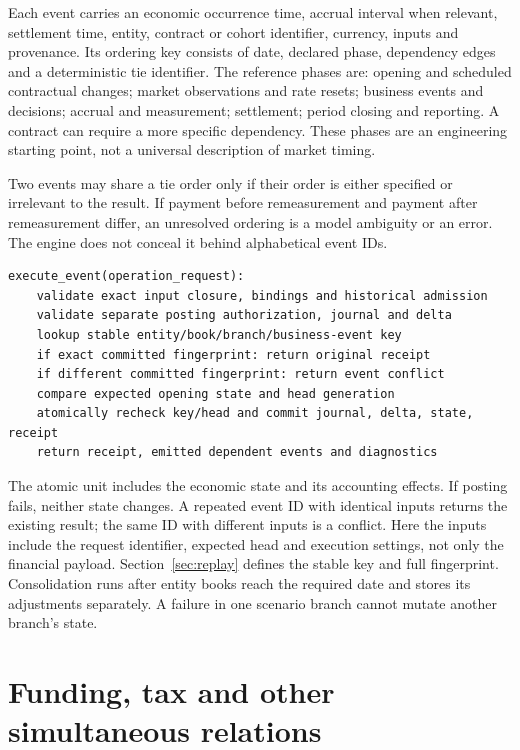 Each event carries an economic occurrence time, accrual interval when relevant,
settlement time, entity, contract or cohort identifier, currency, inputs and
provenance. Its ordering key consists of date, declared phase, dependency edges
and a deterministic tie identifier. The reference phases are: opening and
scheduled contractual changes; market observations and rate resets; business
events and decisions; accrual and measurement; settlement; period closing and
reporting. A contract can require a more specific dependency. These phases are
an engineering starting point, not a universal description of market timing.

Two events may share a tie order only if their order is either specified or
irrelevant to the result. If payment before remeasurement and payment after
remeasurement differ, an unresolved ordering is a model ambiguity or an error.
The engine does not conceal it behind alphabetical event IDs.

\begin{lstlisting}
execute_event(operation_request):
    validate exact input closure, bindings and historical admission
    validate separate posting authorization, journal and delta
    lookup stable entity/book/branch/business-event key
    if exact committed fingerprint: return original receipt
    if different committed fingerprint: return event conflict
    compare expected opening state and head generation
    atomically recheck key/head and commit journal, delta, state, receipt
    return receipt, emitted dependent events and diagnostics
\end{lstlisting}

The atomic unit includes the economic state and its accounting effects.
If posting fails, neither state changes. A repeated event ID with identical
inputs returns the existing result; the same ID with different inputs is a
conflict. Here the inputs include the request identifier, expected head and
execution settings, not only the financial payload. Section~\ref{sec:replay}
defines the stable key and full fingerprint. Consolidation runs after entity books reach the required date and
stores its adjustments separately. A failure in one scenario branch cannot
mutate another branch's state.


\section{Funding, tax and other simultaneous relations}

